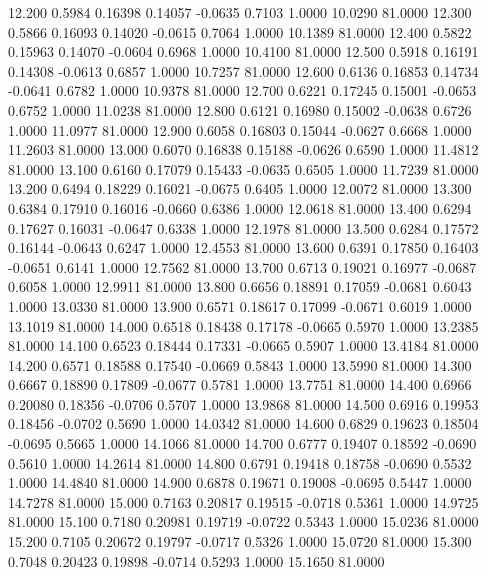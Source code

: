   12.200   0.5984   0.16398   0.14057  -0.0635   0.7103   1.0000  10.0290  81.0000
  12.300   0.5866   0.16093   0.14020  -0.0615   0.7064   1.0000  10.1389  81.0000
  12.400   0.5822   0.15963   0.14070  -0.0604   0.6968   1.0000  10.4100  81.0000
  12.500   0.5918   0.16191   0.14308  -0.0613   0.6857   1.0000  10.7257  81.0000
  12.600   0.6136   0.16853   0.14734  -0.0641   0.6782   1.0000  10.9378  81.0000
  12.700   0.6221   0.17245   0.15001  -0.0653   0.6752   1.0000  11.0238  81.0000
  12.800   0.6121   0.16980   0.15002  -0.0638   0.6726   1.0000  11.0977  81.0000
  12.900   0.6058   0.16803   0.15044  -0.0627   0.6668   1.0000  11.2603  81.0000
  13.000   0.6070   0.16838   0.15188  -0.0626   0.6590   1.0000  11.4812  81.0000
  13.100   0.6160   0.17079   0.15433  -0.0635   0.6505   1.0000  11.7239  81.0000
  13.200   0.6494   0.18229   0.16021  -0.0675   0.6405   1.0000  12.0072  81.0000
  13.300   0.6384   0.17910   0.16016  -0.0660   0.6386   1.0000  12.0618  81.0000
  13.400   0.6294   0.17627   0.16031  -0.0647   0.6338   1.0000  12.1978  81.0000
  13.500   0.6284   0.17572   0.16144  -0.0643   0.6247   1.0000  12.4553  81.0000
  13.600   0.6391   0.17850   0.16403  -0.0651   0.6141   1.0000  12.7562  81.0000
  13.700   0.6713   0.19021   0.16977  -0.0687   0.6058   1.0000  12.9911  81.0000
  13.800   0.6656   0.18891   0.17059  -0.0681   0.6043   1.0000  13.0330  81.0000
  13.900   0.6571   0.18617   0.17099  -0.0671   0.6019   1.0000  13.1019  81.0000
  14.000   0.6518   0.18438   0.17178  -0.0665   0.5970   1.0000  13.2385  81.0000
  14.100   0.6523   0.18444   0.17331  -0.0665   0.5907   1.0000  13.4184  81.0000
  14.200   0.6571   0.18588   0.17540  -0.0669   0.5843   1.0000  13.5990  81.0000
  14.300   0.6667   0.18890   0.17809  -0.0677   0.5781   1.0000  13.7751  81.0000
  14.400   0.6966   0.20080   0.18356  -0.0706   0.5707   1.0000  13.9868  81.0000
  14.500   0.6916   0.19953   0.18456  -0.0702   0.5690   1.0000  14.0342  81.0000
  14.600   0.6829   0.19623   0.18504  -0.0695   0.5665   1.0000  14.1066  81.0000
  14.700   0.6777   0.19407   0.18592  -0.0690   0.5610   1.0000  14.2614  81.0000
  14.800   0.6791   0.19418   0.18758  -0.0690   0.5532   1.0000  14.4840  81.0000
  14.900   0.6878   0.19671   0.19008  -0.0695   0.5447   1.0000  14.7278  81.0000
  15.000   0.7163   0.20817   0.19515  -0.0718   0.5361   1.0000  14.9725  81.0000
  15.100   0.7180   0.20981   0.19719  -0.0722   0.5343   1.0000  15.0236  81.0000
  15.200   0.7105   0.20672   0.19797  -0.0717   0.5326   1.0000  15.0720  81.0000
  15.300   0.7048   0.20423   0.19898  -0.0714   0.5293   1.0000  15.1650  81.0000
